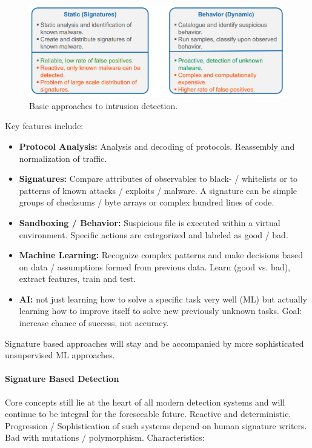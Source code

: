 \begin{figure}[h]
	\centering
	\includegraphics[scale=0.8]{images/911-techniques.PNG}
	\caption{Basic approaches to intrusion detection.}
	\label{fig:techniques}
\end{figure}

Key features include:
\begin{itemize}
    \item \textbf{Protocol Analysis:} Analysis and decoding of protocols. Reassembly and normalization of traffic.
    \item \textbf{Signatures:} Compare attributes of observables to black- / whitelists or to patterns of known attacks / exploits / malware. A signature can be simple groups of checksums / byte arrays or complex hundred lines of code.
    \item \textbf{Sandboxing / Behavior:} Suspicious file is executed within a virtual environment. Specific actions are categorized and labeled as good / bad.
    \item \textbf{Machine Learning:} Recognize complex patterns and make decisions based on data / assumptions formed from previous data. Learn (good vs. bad), extract features, train and test.
    \item \textbf{AI:} not just learning how to solve a specific task very well (ML) but actually learning how to improve itself to solve new previously unknown tasks. Goal: increase chance of success, not accuracy.
\end{itemize}

Signature based approaches will stay and be accompanied by more sophisticated unsupervised ML approaches.

\paragraph{Signature Based Detection}
Core concepts still lie at the heart of all modern detection systems and will continue to be integral for the foreseeable future. Reactive and deterministic. Progression / Sophistication of such systems depend on human signature writers. Bad with mutations / polymorphism. Characteristics:

